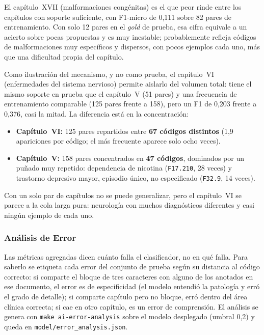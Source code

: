 El capítulo~XVII (malformaciones congénitas) es el que peor rinde entre los capítulos con soporte suficiente, con F1-micro de 0,111 sobre 82 pares de entrenamiento. Con solo 12 pares en el \emph{gold} de prueba, esa cifra equivale a un acierto sobre pocas propuestas y es muy inestable; probablemente refleja códigos de malformaciones muy específicos y dispersos, con pocos ejemplos cada uno, más que una dificultad propia del capítulo.

Como ilustración del mecanismo, y no como prueba, el capítulo~VI (enfermedades del sistema nervioso) permite aislarlo del volumen total: tiene el mismo soporte en prueba que el capítulo~V (51 pares) y una frecuencia de entrenamiento comparable (125 pares frente a 158), pero un F1 de 0,203 frente a 0,376, casi la mitad. La diferencia está en la concentración:

\begin{itemize}
 \item \textbf{Capítulo~VI:} 125 pares repartidos entre \textbf{67 códigos distintos} (1,9 apariciones por código; el más frecuente aparece solo ocho veces).
 \item \textbf{Capítulo~V:} 158 pares concentrados en \textbf{47 códigos}, dominados por un puñado muy repetido: dependencia de nicotina (\texttt{F17.210}, 28 veces) y trastorno depresivo mayor, episodio único, no especificado (\texttt{F32.9}, 14 veces).
\end{itemize}

Con un solo par de capítulos no se puede generalizar, pero el capítulo~VI se parece a la cola larga pura: neurología con muchos diagnósticos diferentes y casi ningún ejemplo de cada uno.

\subsubsection*{Análisis de Error}

Las métricas agregadas dicen cuánto falla el clasificador, no en qué falla. Para saberlo se etiqueta cada error del conjunto de prueba según su distancia al código correcto: si comparte el bloque de tres caracteres con alguno de los anotados en ese documento, el error es de especificidad (el modelo entendió la patología y erró el grado de detalle); si comparte capítulo pero no bloque, erró dentro del área clínica correcta; si cae en otro capítulo, es un error de comprensión. El análisis se genera con \texttt{make ai-error-analysis} sobre el modelo desplegado (umbral 0,2) y queda en \texttt{model/error\_analysis.json}.

